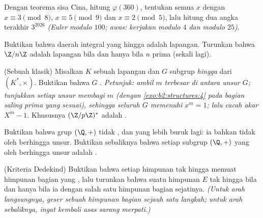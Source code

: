 \begin{exercise}[$\star\star$]\label{exo:b2:structures:8}
Dengan teorema sisa Cina, hitung $\varphi(360)$, tentukan semua
$x$ dengan $x \equiv 3 \pmod 8$, $x \equiv 5 \pmod 9$ dan $x
\equiv 2 \pmod 5$, lalu hitung dua angka terakhir $3^{2026}$
\emph{(Euler modulo $100$; awas: kerjakan modulo $4$ dan modulo $25$)}.
\end{exercise}

\begin{exercise}[$\star\star\star$]\label{exo:b2:structures:9}
Buktikan bahwa daerah integral yang hingga adalah lapangan. Turunkan
bahwa $\Z/n\Z$ adalah lapangan bila dan hanya bila $n$ prima (sekali lagi).
\end{exercise}

\begin{exercise}[$\star\star\star$]\label{exo:b2:structures:10}
(Sebuah klasik) Misalkan $K$ sebuah lapangan dan $G$ subgrup
\emph{hingga} dari $(K^*, \times)$. Buktikan bahwa $G$ .
\emph{Petunjuk: ambil $m$  terbesar di antara unsur $G$;
tunjukkan  setiap unsur membagi $m$ (dengan
\cref{exo:b2:structures:4} pada bagian saling prima yang sesuai),
sehingga seluruh $G$ memenuhi $x^m = 1$; lalu cacah akar $X^m - 1$.}
Khususnya $(\Z/p\Z)^*$ adalah .
\end{exercise}

\begin{exercise}[$\star\star\star$]\label{exo:b2:structures:11}
Buktikan bahwa grup $(\Q, +)$ tidak , dan yang lebih buruk lagi:
ia bahkan tidak  oleh berhingga unsur. Buktikan sebaliknya
bahwa setiap subgrup $(\Q, +)$ yang  oleh berhingga unsur adalah .
\end{exercise}

\begin{exercise}[$\star\star$]\label{exo:b2:structures:12}
(Kriteria Dedekind) Buktikan bahwa setiap himpunan tak hingga memuat
himpunan bagian yang , lalu turunkan bahwa suatu himpunan $E$
tak hingga bila dan hanya bila ia  dengan salah satu himpunan
bagian sejatinya. \emph{(Untuk arah langsungnya, geser sebuah himpunan
bagian  sejauh satu langkah; untuk arah sebaliknya, ingat kembali asas sarang merpati.)}
\end{exercise}

